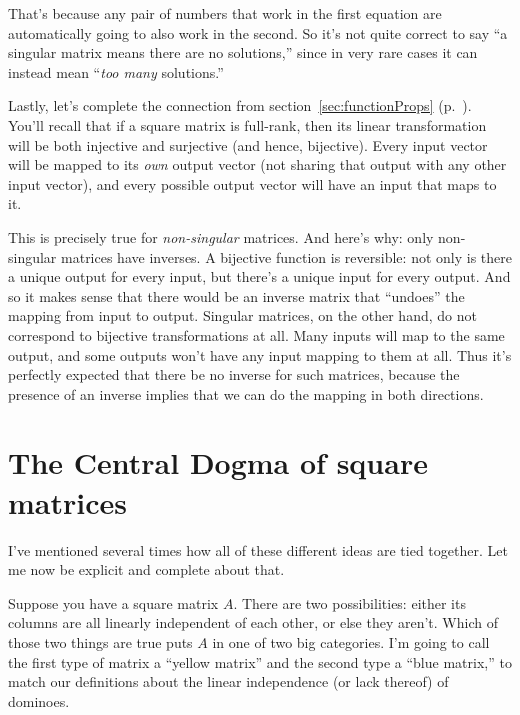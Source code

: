 That's because any pair of numbers that work in the first equation are
automatically going to also work in the second. So it's not quite correct to
say ``a singular matrix means there are no solutions,'' since in very rare
cases it can instead mean ``\textit{too many} solutions.''

\medskip
\pagebreak


Lastly, let's complete the connection from section~\ref{sec:functionProps}
(p.~\pageref{sec:functionProps}). You'll recall that if a square matrix is
full-rank, then its linear transformation will be both injective and surjective
(and hence, bijective). Every input vector will be mapped to its \textit{own}
output vector (not sharing that output with any other input vector), and every
possible output vector will have an input that maps to it.


This is precisely true for \textit{non-singular} matrices. And here's why: only
non-singular matrices have inverses. A bijective function is reversible: not
only is there a unique output for every input, but there's a unique input for
every output. And so it makes sense that there would be an inverse matrix that
``undoes'' the mapping from input to output. Singular matrices, on the other
hand, do not correspond to bijective transformations at all. Many inputs will
map to the same output, and some outputs won't have any input mapping to them
at all. Thus it's perfectly expected that there be no inverse for such
matrices, because the presence of an inverse implies that we can do the mapping
in both directions.

\section{The Central Dogma of square matrices}

I've mentioned several times how all of these different ideas are tied
together. Let me now be explicit and complete about that.


Suppose you have a square matrix $A$. There are two possibilities: either its
columns are all linearly independent of each other, or else they aren't. Which
of those two things are true puts $A$ in one of two big categories. I'm going
to call the first type of matrix a ``yellow matrix'' and the second type a
``blue matrix,'' to match our definitions about the linear independence (or
lack thereof) of dominoes.


